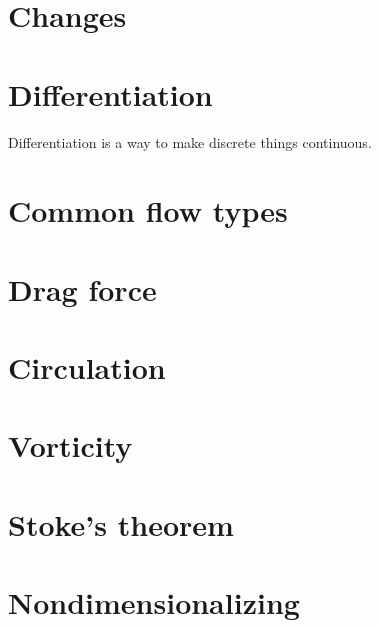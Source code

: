 \documentclass[10pt]{report}
\begin{document}
\chapter{Changes}








\chapter{Differentiation}

Differentiation is a way to make discrete things continuous.

\chapter{Common flow types}






\chapter{Drag force}





\chapter{Circulation}



\chapter{Vorticity}



\chapter{Stoke's theorem}



\chapter{Nondimensionalizing}
\end{document}
